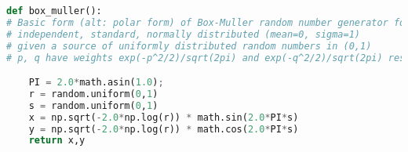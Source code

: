 \begin{lstlisting}[language=Python]
def box_muller():  
# Basic form (alt: polar form) of Box-Muller random number generator for pairs of 
# independent, standard, normally distributed (mean=0, sigma=1) 
# given a source of uniformly distributed random numbers in (0,1)
# p, q have weights exp(-p^2/2)/sqrt(2pi) and exp(-q^2/2)/sqrt(2pi) respectively. 

    PI = 2.0*math.asin(1.0);    
    r = random.uniform(0,1)
    s = random.uniform(0,1)
    x = np.sqrt(-2.0*np.log(r)) * math.sin(2.0*PI*s)
    y = np.sqrt(-2.0*np.log(r)) * math.cos(2.0*PI*s)
    return x,y
\end{lstlisting}